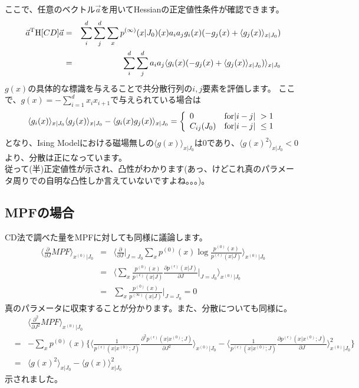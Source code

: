 \documentclass[11pt]{article}
\begin{document}
ここで、任意のベクトル${\vec a}$を用いてHessianの正定値性条件が確認できます。\\
\begin{eqnarray}
	{\vec a}^{\rm T}{\rm H}[CD]{\vec a}&=&\sum_{i}^{d}\sum_{j}^{d}\sum_{x}p^{(\infty)}(x|J_0)(x)a_i a_j g_i (x)(-g_j(x)+\langle g_j (x)\rangle_{x|J_0})\\
	&=&\sum_{i}^{d}\sum_{j}^{d}a_i a_j\langle g_i (x)(-g_j(x)+\langle g_j (x)\rangle_{x|J_0}) \rangle_{x|J_0} 
\end{eqnarray}
$g(x)$の具体的な標識を与えることで共分散行列の$i,j$要素を評価します。
ここで、$g(x)=-\sum_{i=1}^d x_i x_{i+1}$で与えられている場合は
\begin{equation}
	\langle g_i (x) \rangle_{x|J_0} \langle g_j(x) \rangle_{x|J_0}- \langle g_i(x) g_j (x) \rangle_{x|J_0} =\left\{  \begin{array}{ll}
		0 &   {\rm for}|i-j|\ >1\\
			C_{ij}(J_0) &   {\rm for}|i-j|\ \leq1
	\end{array}\right.
\end{equation}
となり、Ising Modelにおける磁場無しの$\langle g(x) \rangle_{x|J_0}$は0であり、$\langle {g(x)}^2 \rangle_{x|J_0}< 0$より、分散は正になっています。\\
従って(半)正定値性が示され、凸性がわかります(あっ、けどこれ真のパラメータ周りでの自明な凸性しか言えていないですよね。。。)。

\subsection{MPFの場合}
CD法で調べた量をMPFに対しても同様に議論します。\\
\begin{eqnarray}
	\langle \frac{\partial}{\partial J}MPF \rangle_{x^{(0)}|J_0}&=&\langle \frac{\partial}{\partial J}|_{J=J_0}\sum_{x}p^{(0)}(x)\log\frac{ p^{(0)}(x)}{p^{(\epsilon)}(x|J)}\rangle_{x^{(0)}|J_0} \\
	&=&\langle \sum_{x} \frac{p^{(0)}(x)}{p^{(\epsilon)}(x|J)} \frac{\partial p^{(\epsilon)}(x|J)}{\partial J}|_{J=J_0}\rangle_{x^{(0)}|J_0}\\ 
	&=&\sum_{x} \frac{p^{(0)}(x)}{p^{(\infty)}(x|J)}|_{J=J_0}=0
\end{eqnarray}
真のパラメータに収束することが分かります。また、分散についても同様に。\\
\begin{eqnarray}
	&&\langle \frac{{\partial}^2}{\partial J^2}MPF \rangle_{x^{(0)}|J_0}\\
	&=&-\sum_{x}p^{(0)}(x)\{\langle \frac{1}{p^{(\epsilon)}(x|x^{(0)};J)}\frac{\partial^2 p^{(\epsilon)}(x|x^{(0)};J)}{\partial J^2}\rangle_{x^{(0)}|J_0} -\langle \frac{1}{p^{(\epsilon)}(x|x^{(0)};J)}\frac{\partial p^{(\epsilon)}(x|x^{(0)};J)}{\partial J}\rangle_{x^{(0)}|J_0}^2\}\\
	&=&\langle g(x)^2\rangle_{x|J_0}-\langle g(x)\rangle_{x|J_0}^2
\end{eqnarray}
示されました。
\end{document}
